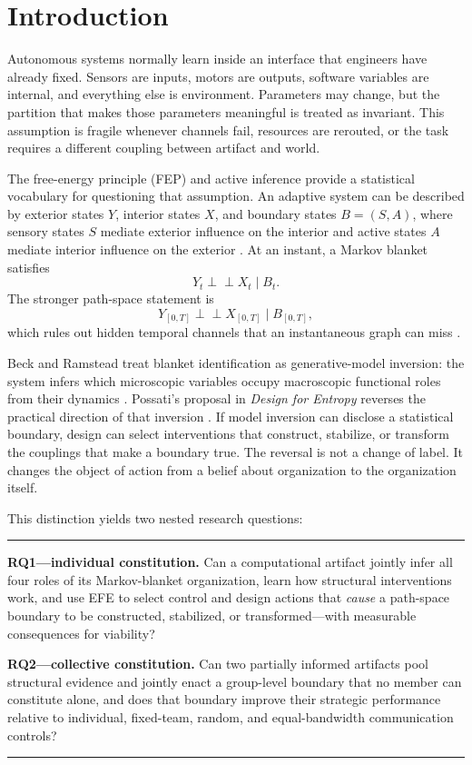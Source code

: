 \documentclass[11pt,a4paper]{article}
\numberwithin{equation}{section}
\newcommand{\indep}{\perp\!\!\!\perp}
\newenvironment{keybox}{\begin{center}\begin{minipage}{0.94\textwidth}\color{navy}\hrule\vspace{0.55em}\small}
  {\vspace{0.55em}\hrule\end{minipage}\end{center}}
\begin{document}
{\small\tableofcontents}
\newpage

\section{Introduction}

Autonomous systems normally learn inside an interface that engineers have
already fixed. Sensors are inputs, motors are outputs, software variables are
internal, and everything else is environment. Parameters may change, but the
partition that makes those parameters meaningful is treated as invariant.
This assumption is fragile whenever channels fail, resources are rerouted, or
the task requires a different coupling between artifact and world.

The free-energy principle (FEP) and active inference provide a statistical
vocabulary for questioning that assumption. An adaptive system can be
described by exterior states $Y$, interior states $X$, and boundary states
$B=(S,A)$, where sensory states $S$ mediate exterior influence on the
interior and active states $A$ mediate interior influence on the exterior
\cite{friston2009,friston2010,kirchhoff2018,friston2019,ramstead2023}. At an
instant, a Markov blanket satisfies
\begin{equation}
  Y_t\indep X_t\mid B_t.
  \label{eq:fixed-blanket}
\end{equation}
The stronger path-space statement is
\begin{equation}
  Y_{[0,T]}\indep X_{[0,T]}\mid B_{[0,T]},
  \label{eq:path-blanket}
\end{equation}
which rules out hidden temporal channels that an instantaneous graph can miss
\cite{friston2023,sakthivadivel2026}.

Beck and Ramstead treat blanket identification as generative-model inversion:
the system infers which microscopic variables occupy macroscopic functional
roles from their dynamics \cite{beckramstead2025}. Possati's proposal in
\emph{Design for Entropy} reverses the practical direction of that inversion
\cite{possati2026}. If model inversion can disclose a statistical boundary,
design can select interventions that construct, stabilize, or transform the
couplings that make a boundary true. The reversal is not a change of label.
It changes the object of action from a belief about organization to the
organization itself.

This distinction yields two nested research questions:
\begin{keybox}
\textbf{RQ1---individual constitution.} Can a computational artifact jointly infer all
four roles of its Markov-blanket organization, learn how structural
interventions work, and use EFE to select control and design actions that
\emph{cause} a path-space boundary to be constructed, stabilized, or
transformed---with measurable consequences for viability?

\textbf{RQ2---collective constitution.} Can two partially informed artifacts
pool structural evidence and jointly enact a group-level boundary that no
member can constitute alone, and does that boundary improve their strategic
performance relative to individual, fixed-team, random, and equal-bandwidth
communication controls?
\end{keybox}
\end{document}
